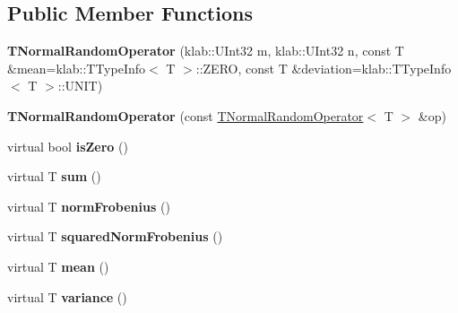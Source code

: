 \subsection*{Public Member Functions}
\begin{DoxyCompactItemize}
\item 
{\bfseries T\+Normal\+Random\+Operator} (klab\+::\+U\+Int32 m, klab\+::\+U\+Int32 n, const T \&mean=klab\+::\+T\+Type\+Info$<$ T $>$\+::Z\+E\+RO, const T \&deviation=klab\+::\+T\+Type\+Info$<$ T $>$\+::U\+N\+IT)\hypertarget{classkl1p_1_1TNormalRandomOperator_a748f3f7721330f3cf72b67aac9359aa6}{}\label{classkl1p_1_1TNormalRandomOperator_a748f3f7721330f3cf72b67aac9359aa6}

\item 
{\bfseries T\+Normal\+Random\+Operator} (const \hyperlink{classkl1p_1_1TNormalRandomOperator}{T\+Normal\+Random\+Operator}$<$ T $>$ \&op)\hypertarget{classkl1p_1_1TNormalRandomOperator_a7d185c5e5edfb3fb2770a75ecd7b3acc}{}\label{classkl1p_1_1TNormalRandomOperator_a7d185c5e5edfb3fb2770a75ecd7b3acc}

\item 
virtual bool {\bfseries is\+Zero} ()\hypertarget{classkl1p_1_1TNormalRandomOperator_a1973ccc0ad750a534862796b2ad230ff}{}\label{classkl1p_1_1TNormalRandomOperator_a1973ccc0ad750a534862796b2ad230ff}

\item 
virtual T {\bfseries sum} ()\hypertarget{classkl1p_1_1TNormalRandomOperator_a118feecbff406d217c69e5784c388639}{}\label{classkl1p_1_1TNormalRandomOperator_a118feecbff406d217c69e5784c388639}

\item 
virtual T {\bfseries norm\+Frobenius} ()\hypertarget{classkl1p_1_1TNormalRandomOperator_a3395e9dc31b98721aefc9b7e5ffbd4f0}{}\label{classkl1p_1_1TNormalRandomOperator_a3395e9dc31b98721aefc9b7e5ffbd4f0}

\item 
virtual T {\bfseries squared\+Norm\+Frobenius} ()\hypertarget{classkl1p_1_1TNormalRandomOperator_aa7948235286835ad2f5c9513afa4e8bf}{}\label{classkl1p_1_1TNormalRandomOperator_aa7948235286835ad2f5c9513afa4e8bf}

\item 
virtual T {\bfseries mean} ()\hypertarget{classkl1p_1_1TNormalRandomOperator_a7f1abae54c282dbae9ef1ed8a887bf9a}{}\label{classkl1p_1_1TNormalRandomOperator_a7f1abae54c282dbae9ef1ed8a887bf9a}

\item 
virtual T {\bfseries variance} ()\hypertarget{classkl1p_1_1TNormalRandomOperator_abdad261ab8bee1da9eb39638996e2ca8}{}\label{classkl1p_1_1TNormalRandomOperator_abdad261ab8bee1da9eb39638996e2ca8}


\end{DoxyCompactItemize}
